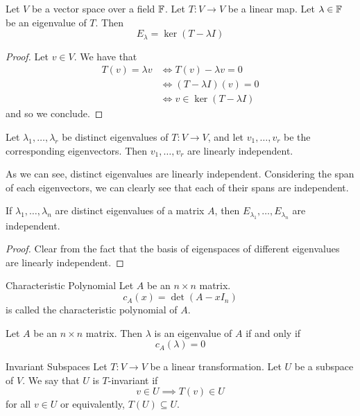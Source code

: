 \documentclass[a4paper]{article}
\begin{document}
\begin{lmm}{}{} Let $V$ be a vector space over a field $\mathbb{F}$. Let $T:V\to V$ be a linear map. Let $\lambda\in\mathbb{F}$ be an eigenvalue of $T$. Then $$E_\lambda=\ker(T-\lambda I)$$ \tcbline
\begin{proof}
Let $v\in V$. We have that 
\begin{align*}
T(v)=\lambda v&\iff T(v)-\lambda v=0\\
&\iff (T-\lambda I)(v)=0\\
&\iff v\in\ker(T-\lambda I)
\end{align*}
and so we conclude. 
\end{proof}
\end{lmm}

\begin{prp}{}{} Let $\lambda_1,\dots,\lambda_r$ be distinct eigenvalues of $T:V\to V$, and let $v_1,\dots,v_r$ be the corresponding eigenvectors. Then $v_1,\dots,v_r$ are linearly independent. 
\end{prp}

As we can see, distinct eigenvalues are linearly independent. Considering the span of each eigenvectors, we can clearly see that each of their spans are independent. 

\begin{prp}{}{} If $\lambda_1,\dots,\lambda_n$ are distinct eigenvalues of a matrix $A$, then $E_{\lambda_1},\dots,E_{\lambda_n}$ are independent. \tcbline
\begin{proof}
Clear from the fact that the basis of eigenspaces of different eigenvalues are linearly independent. 
\end{proof}
\end{prp}

\begin{defn}{Characteristic Polynomial}{} Let $A$ be an $n\times n$ matrix. $$c_A(x)=\det(A-xI_n)$$ is called the characteristic polynomial of $A$. 
\end{defn}

\begin{prp}{}{} Let $A$ be an $n\times n$ matrix. Then $\lambda$ is an eigenvalue of $A$ if and only if $$c_A(\lambda)=0$$
\end{prp}

\begin{defn}{Invariant Subspaces}{} Let $T:V\to V$ be a linear transformation. Let $U$ be a subspace of $V$. We say that $U$ is $T$-invariant if $$v\in U\implies T(v)\in U$$ for all $v\in U$ or equivalently, $T(U)\subseteq U$. 
\end{defn}
\end{document}
